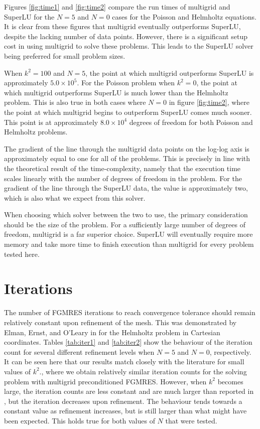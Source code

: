 Figures \ref{fig:time1} and \ref{fig:time2} compare the run times of multigrid and SuperLU for the $N=5$ and $N=0$ cases for the Poisson and Helmholtz equations.
It is clear from these figures that multigrid eventually outperforms SuperLU, despite the lacking number of data points.
However, there is a significant setup cost in using multigrid to solve these problems.
This leads to the SuperLU solver being preferred for small problem sizes.

When $k^2=100$ and $N=5$, the point at which multigrid outperforms SuperLU is approximately $5.0\times 10^5$.
For the Poisson problem when $k^2=0$, the point at which multigrid outperforms SuperLU is much lower than the Helmholtz problem.
This is also true in both cases where $N=0$ in figure \ref{fig:time2}, where the point at which multigrid begins to outperform SuperLU comes much sooner.
This point is at approximately $8.0\times 10^4$ degrees of freedom for both Poisson and Helmholtz problems.

The gradient of the line through the multigrid data points on the log-log axis is approximately equal to one for all of the problems.
This is precisely in line with the theoretical result of the time-complexity, namely that the execution time scales linearly with the number of degrees of freedom in the problem.
For the gradient of the line through the SuperLU data, the value is approximately two, which is also what we expect from this solver.

When choosing which solver between the two to use, the primary consideration should be the size of the problem.
For a sufficiently large number of degrees of freedom, multigrid is a far superior choice.
SuperLU will eventually require more memory and take more time to finish execution than multigrid for every problem tested here.









\section{Iterations}

The number of FGMRES iterations to reach convergence tolerance should remain relatively constant upon refinement of the mesh.
This was demonstrated by Elman, Ernst, and O'Leary in \cite{elman} for the Helmholtz problem in Cartesian coordinates.
Tables \ref{tab:iter1} and \ref{tab:iter2} show the behaviour of the iteration count for several different refinement levels when $N=5$ and $N=0$, respectively.
It can be seen here that our results match closely with the literature for small values of $k^2$., where we obtain relatively similar iteration counts for the solving problem with multigrid preconditioned FGMRES.
However, when $k^2$ becomes large, the iteration counts are less constant and are much larger than reported in \cite{elman}, but the iteration decreases upon refinement.
The behaviour tends towards a constant value as refinement increases, but is still larger than what might have been expected.
This holds true for both values of $N$ that were tested.


